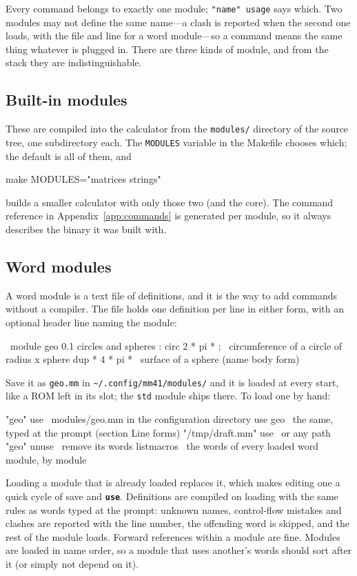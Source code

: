 \documentclass[11pt,letterpaper]{article}
\newcommand{\code}[1]{\texttt{#1}}
\newcommand{\cmd}[1]{\texttt{\textbf{#1}}}
\begin{document}
Every command belongs to exactly one module; \code{"name" usage} says which. Two modules may not define the same name---a clash is reported when the second one loads, with the file and line for a word module---so a command means the same thing whatever is plugged in. There are three kinds of module, and from the stack they are indistinguishable.

\subsection{Built-in modules}

These are compiled into the calculator from the \code{modules/} directory of the source tree, one subdirectory each. The \code{MODULES} variable in the Makefile chooses which; the default is all of them, and
\begin{shell}
make MODULES="matrices strings"
\end{shell}
builds a smaller calculator with only those two (and the core). The command reference in Appendix~\ref{app:commands} is generated per module, so it always describes the binary it was built with.

\subsection{Word modules}

A word module is a text file of definitions, and it is the way to add commands without a compiler. The file holds one definition per line in either form, with an optional header line naming the module:
\begin{rpn}
\ module geo 0.1 circles and spheres
: circ 2 * pi * ;              \ circumference of a circle of radius x
sphere dup * 4 * pi *          \ surface of a sphere (name body form)
\end{rpn}
Save it as \code{geo.mm} in \code{\textasciitilde/.config/mm41/modules/} and it is loaded at every start, like a ROM left in its slot; the \code{std} module ships there. To load one by hand:
\begin{rpn}
"geo" use                  \ modules/geo.mm in the configuration directory
use geo                    \ the same, typed at the prompt (section Line forms)
"/tmp/draft.mm" use        \ or any path
"geo" unuse                \ remove its words
listmacros                 \ the words of every loaded word module, by module
\end{rpn}
Loading a module that is already loaded replaces it, which makes editing one a quick cycle of save and \cmd{use}. Definitions are compiled on loading with the same rules as words typed at the prompt: unknown names, control-flow mistakes and clashes are reported with the line number, the offending word is skipped, and the rest of the module loads. Forward references within a module are fine. Modules are loaded in name order, so a module that uses another's words should sort after it (or simply not depend on it).
\end{document}

